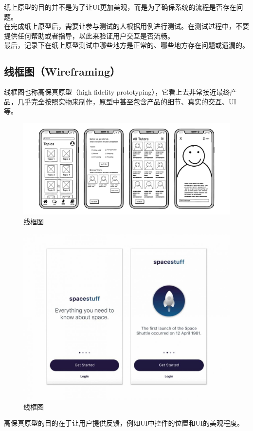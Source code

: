纸上原型的目的并不是为了让UI更加美观，而是为了确保系统的流程是否存在问题。\\

在完成纸上原型后，需要让参与测试的人根据用例进行测试。在测试过程中，不要提供任何帮助或者指导，以此来验证用户交互是否流畅。\\

最后，记录下在纸上原型测试中哪些地方是正常的、哪些地方存在问题或遗漏的。\\

\subsection{线框图（Wireframing）}

线框图也称高保真原型（high fidelity prototyping），它看上去非常接近最终产品，几乎完全按照实物来制作，原型中甚至包含产品的细节、真实的交互、UI等。\\

\begin{figure}[H]
    \centering
    \includegraphics[scale=0.35]{img/C1/1-3/3.png}
    \caption{线框图}
\end{figure}

\begin{figure}[H]
    \centering
    \includegraphics[scale=0.5]{img/C1/1-3/4.png}
    \caption{线框图}
\end{figure}

高保真原型的目的在于让用户提供反馈，例如UI中控件的位置和UI的美观程度。

\newpage